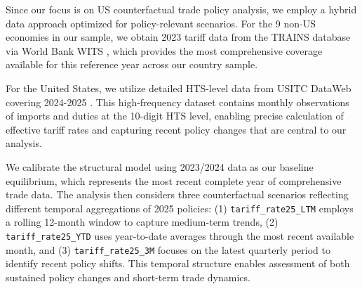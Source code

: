 Since our focus is on US counterfactual trade policy analysis, we employ a hybrid data approach optimized for policy-relevant scenarios. For the 9 non-US economies in our sample, we obtain 2023 tariff data from the TRAINS database via World Bank WITS \citep{WorldBank_WITS}, which provides the most comprehensive coverage available for this reference year across our country sample.

For the United States, we utilize detailed HTS-level data from USITC DataWeb covering 2024-2025 \citep{USITC_DataWeb_HTS}. This high-frequency dataset contains monthly observations of imports and duties at the 10-digit HTS level, enabling precise calculation of effective tariff rates and capturing recent policy changes that are central to our analysis.

We calibrate the structural model using 2023/2024 data as our baseline equilibrium, which represents the most recent complete year of comprehensive trade data. The analysis then considers three counterfactual scenarios reflecting different temporal aggregations of 2025 policies: (1) \texttt{tariff\_rate25\_LTM} employs a rolling 12-month window to capture medium-term trends, (2) \texttt{tariff\_rate25\_YTD} uses year-to-date averages through the most recent available month, and (3) \texttt{tariff\_rate25\_3M} focuses on the latest quarterly period to identify recent policy shifts. This temporal structure enables assessment of both sustained policy changes and short-term trade dynamics.